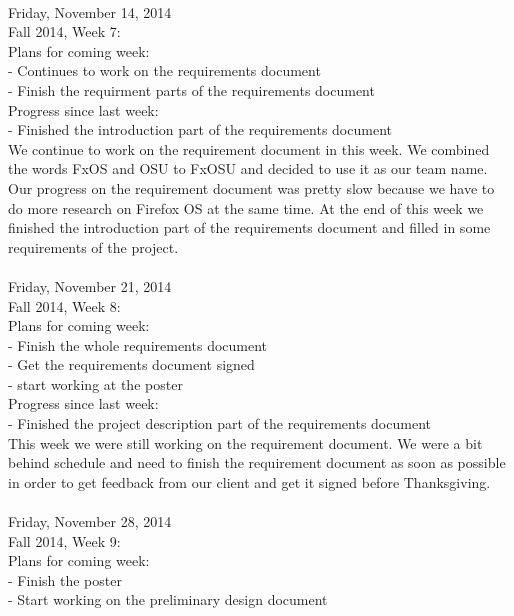 {\hrulefill \\
Friday, November 14, 2014 \\
Fall 2014, Week 7: \\

Plans for coming week: \\
- Continues to work on the requirements document \\
- Finish the requirment parts of the requirements document \\

Progress since last week: \\
- Finished the introduction part of the requirements document \\

We continue to work on the requirement document in this week. We combined the words FxOS and OSU to FxOSU and decided to use it as our team name. Our progress on the requirement document was pretty slow because we have to do more research on Firefox OS at the same time. At the end of this week we finished the introduction part of the requirements document and filled in some requirements of the project. \\

\hrulefill \\
Friday, November 21, 2014 \\
Fall 2014, Week 8: \\

Plans for coming week: \\
- Finish the whole requirements document \\
- Get the requirements document signed \\
- start working at the poster \\

Progress since last week: \\
- Finished the project description part of the requirements document \\

This week we were still working on the requirement document. We were a bit behind schedule and need to finish the requirement document as soon as possible in order to get feedback from our client and get it signed before Thanksgiving. \\

\hrulefill \\
Friday, November 28, 2014 \\
Fall 2014, Week 9: \\

Plans for coming week: \\
- Finish the poster \\
- Start working on the preliminary design document \\

}
